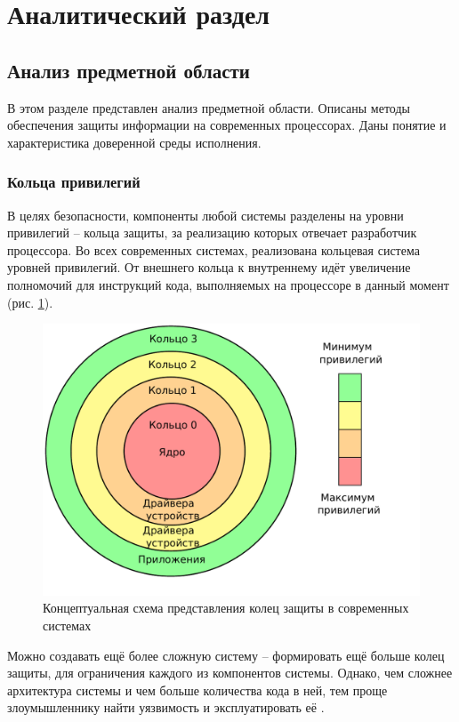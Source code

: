 \section{Аналитический раздел}

\subsection{Анализ предметной области}

В этом разделе представлен анализ предметной области. Описаны методы обеспечения защиты информации на современных процессорах. Даны понятие и характеристика доверенной среды исполнения.

\subsubsection{Кольца привилегий}

В целях безопасности, компоненты любой системы разделены на уровни привилегий -- кольца защиты, за реализацию которых отвечает разработчик процессора. Во всех современных системах, реализована кольцевая система уровней привилегий. От внешнего кольца к внутреннему идёт увеличение полномочий для инструкций кода, выполняемых на процессоре в данный момент (рис. \ref{fig:rings}).

\begin{figure}[h]
	\centering
	\includegraphics[width=\textwidth]{img/rings.pdf}
	\caption{Концептуальная схема представления колец защиты в современных системах}
	\label{fig:rings}
\end{figure}

Можно создавать ещё более сложную систему -- формировать ещё больше колец защиты, для ограничения каждого из компонентов системы. Однако, чем сложнее архитектура системы и чем больше количества кода в ней, тем проще злоумышленнику найти уязвимость и эксплуатировать её \cite{complex-systems}.

